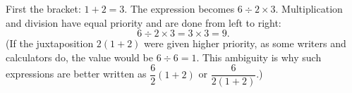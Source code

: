 First the bracket: $1+2=3$. The expression becomes $6\div2\times3$. Multiplication and division have equal priority and are done from left to right:
\[6\div2\times3=3\times3=\boxed{9}.\]
(If the juxtaposition $2(1+2)$ were given higher priority, as some writers and calculators do, the value would be $6\div6=1$. This ambiguity is why such expressions are better written as $\dfrac62(1+2)$ or $\dfrac{6}{2(1+2)}$.)
